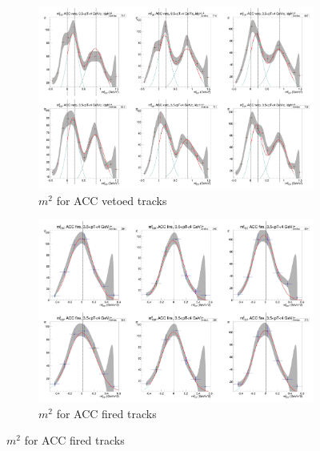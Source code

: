 \begin{figure}[H]
  \ContinuedFloat
    \begin{subfigure}{1\textwidth}
    \includegraphics[width=1\textwidth]{hiptfits/pos/PSm2_cent0_ich1_accfire0_ptbin13.jpg}
    \caption{$m^2$ for ACC vetoed tracks}
    \end{subfigure}
    \begin{subfigure}{1\textwidth}
    \includegraphics[width=1\textwidth]{hiptfits/pos/PSm2_cent0_ich1_accfire1_ptbin13.jpg}
    \caption{$m^2$ for ACC fired tracks}
    \end{subfigure}  
\end{figure}
